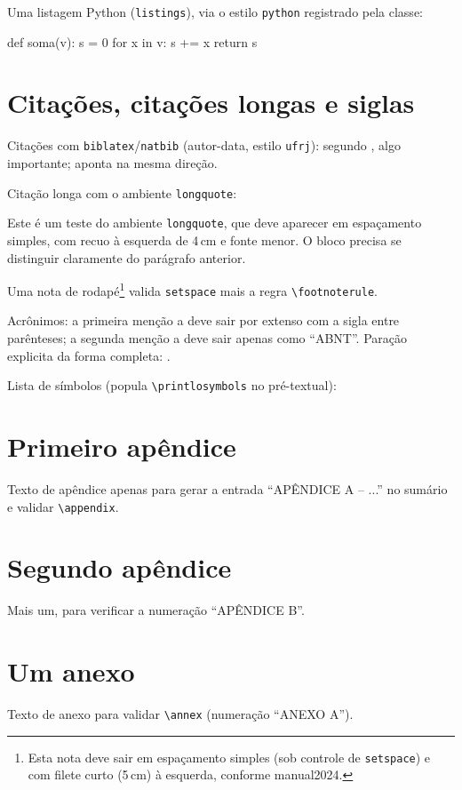 \documentclass[dsc]{ufrj}
\begin{document}
  Uma listagem Python (\texttt{listings}), via o estilo \texttt{python}
  registrado pela classe:
  \begin{python}
def soma(v):
    s = 0
    for x in v:
        s += x
    return s
  \end{python}

  \chapter{Citações, citações longas e siglas}
  \label{cap:cite}

  Citações com \texttt{biblatex}/\texttt{natbib} (autor-data, estilo
  \texttt{ufrj}): segundo \citet{book-example}, algo importante;
  \citep{article-example} aponta na mesma direção.

  Citação longa com o ambiente \texttt{longquote}:
  \begin{longquote}
  Este é um teste do ambiente \texttt{longquote}, que deve aparecer em
  espaçamento simples, com recuo à esquerda de 4\,cm e fonte menor.
  O bloco precisa se distinguir claramente do parágrafo anterior.
  \end{longquote}

  Uma nota de rodapé\footnote{Esta nota deve sair em espaçamento
  simples (sob controle de \texttt{setspace}) e com filete curto (5\,cm) à
  esquerda, conforme manual2024.} valida \texttt{setspace} mais a regra
  \verb|\footnoterule|.

  Acrônimos: a primeira menção a  deve sair por extenso
  com a sigla entre parênteses; a segunda menção a 
  deve sair apenas como ``ABNT''. Paração explicita da forma
  completa: .

  Lista de símbolos (popula \texttt{\textbackslash printlosymbols} no
  pré-textual):

  \backmatter
  \printbibliography

  \appendix
  \chapter{Primeiro apêndice}
  \label{ap:um}
  Texto de apêndice apenas para gerar a entrada ``APÊNDICE A -- ...''
  no sumário e validar \verb|\appendix|.

  \chapter{Segundo apêndice}
  Mais um, para verificar a numeração ``APÊNDICE B''.

  \annex
  \chapter{Um anexo}
  Texto de anexo para validar \verb|\annex| (numeração ``ANEXO A'').

  \ufrjfinalpage%
\end{document}
